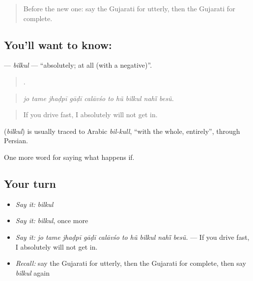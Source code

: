 \label{lesson:GU-C379-bilkul}



\begin{quote}
Before the new one: say the Gujarati for utterly, then the Gujarati for complete.
\end{quote}

\subsection*{You'll want to know: }
\textbf{} — \emph{bilkul} — \textquotedblleft{}absolutely; at all (with a negative)\textquotedblright{}.

\begin{quote}
         .
\end{quote}

\begin{quote}
\emph{jo tame jhaḍpī gāḍī calāvśo to hũ bilkul nahī̃ besũ.}
\end{quote}

\begin{quote}
If you drive fast, I absolutely will not get in.
\end{quote}

\begin{cousinweb}
\textbf{} (\emph{bilkul}) is usually traced to Arabic \emph{bil-kull}, \textquotedblleft{}with the whole, entirely\textquotedblright{}, through Persian.
\end{cousinweb}

\begin{grammarlens}[title={What you've built}]
One more word for saying what happens if.
\end{grammarlens}

\subsection*{Your turn}
\begin{itemize}
\raggedright
  \item \emph{Say it:} \emph{bilkul}
  \item \emph{Say it:} \emph{bilkul}, once more
  \item \emph{Say it:} \emph{jo tame jhaḍpī gāḍī calāvśo to hũ bilkul nahī̃ besũ.} — If you drive fast, I absolutely will not get in.
  \item \emph{Recall:} say the Gujarati for utterly, then the Gujarati for complete, then say \emph{bilkul} again
\end{itemize}


